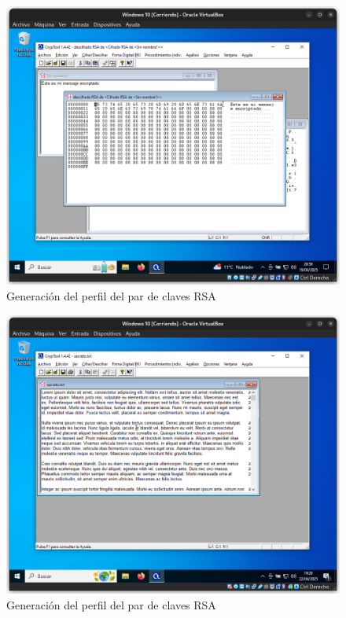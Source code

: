 \begin{figure}[h]
    \includegraphics[width=15cm]{ClavesRSA-07.png}
    \caption{Generación del perfil del par de claves RSA}
\end{figure}

\begin{figure}[h]
    \includegraphics[width=15cm]{EncriptadoRSA-1}
    \caption{Generación del perfil del par de claves RSA}
\end{figure}

